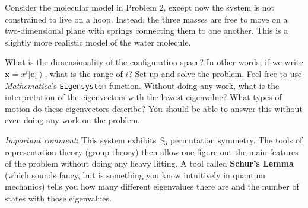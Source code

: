 \documentclass[12pt]{article}
\numberwithin{equation}{section}    %
\renewcommand{\vec}[1]{\mathbf{#1}} %
\begin{document}
Consider the molecular model in Problem 2, except now the system is not constrained to live on a hoop. Instead, the three masses are free to move on a two-dimensional plane with springs connecting them to one another. This is a slightly more realistic model of the water molecule. 

What is the dimensionality of the configuration space? In other words, if we write $\vec{x} = x^i \left|\vec{e}_i\right\rangle$, what is the range of $i$? Set up and solve the problem. Feel free to use \emph{Mathematica}'s \texttt{Eigensystem} function. Without doing any work, what is the interpretation of the eigenvectors with the lowest eigenvalue? What types of motion do these eigenvectors describe? You should be able to answer this without even doing any work on the problem.

\emph{Important comment}: This system exhibits $S_3$ permutation symmetry. The tools of representation theory (group theory) then allow one figure out the main features of the problem without doing any heavy lifting. A tool called \textbf{Schur's Lemma} (which sounds fancy, but is something you know intuitively in quantum mechanics) tells you how many different eigenvalues there are and the number of states with those eigenvalues. 
\end{document}
